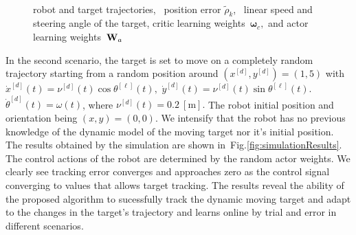\documentclass[conference]{IEEEtran}
\begin{document}
\begin{figure}[htbp]
  \\
\caption[Target tracking performance in following a sinusoidal trajectory.]{ 
   robot and target trajectories,~ position error $\tilde\rho_k$,~ linear speed and steering angle of the target,  critic learning weights~$\bm{\omega}_c,$ and  actor learning weights~${\bf W}_a$}%
  \label{fig:peformanceSinTrajectory}%
\end{figure} 
%

  In the second scenario, the target is set to move on a completely random trajectory starting from a random position around $(x^{[d]},y^{[d]})=(1,5)$ with 
 $\dot x^{[d]}(t) = \nu^{[d]}(t)\cos\theta^{[\ell]}(t),$ %
 $\dot y^{[d]}(t) = \nu^{[d]}(t)\sin\theta^{[\ell]}(t).$
$ \dot\theta^{[d]}(t) = \omega(t)$,
 where $\nu^{[d]}(t)=0.2~[\si{\meter}].$ The robot initial position and orientation being $(x,y) = (0,0)$. We intensify that the robot has no previous knowledge of the dynamic model of the moving target nor it's initial position. The results obtained by the simulation are shown in~Fig.\ref{fig:simulationResults}. The control actions of the robot are determined by the random actor weights. We clearly see tracking error converges and approaches zero as the control signal converging to values that allows target tracking. The results reveal the ability of the proposed algorithm to sucessfully track the dynamic moving target and adapt to the changes in the target's trajectory and learns online by trial and error in different scenarios.      
\end{document}
